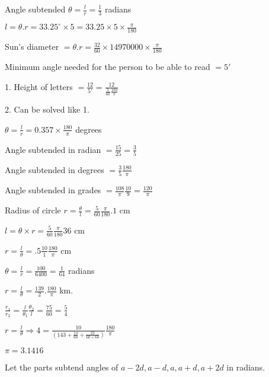 \item Angle subtended $\theta = \frac{l}{r} = \frac{1}{3}$ radians

\item $l = \theta . r = 33.25^\circ \times 5 = 33.25\times 5 \times \frac{\pi}{180}$

\item Sun's diameter $= \theta .r = \frac{32}{60}\times 14970000\times \frac{\pi}{180}$

\item Minimum angle needed for the person to be able to read $= 5'$

    1. Height of letters $= \frac{12}{5'} = \frac{12}{\frac{5}{60}\frac{180}{\pi}}$

    2. Can be solved like 1.

\item $\theta = \frac{l}{r} = 0.357\times \frac{180}{\pi}$ degrees

\item Angle subtended in radian $= \frac{15}{25} = \frac{3}{5}$

    Angle subtended in degrees $= \frac{3}{5}\frac{180}{\pi}$

    Angle subtended in grades $= \frac{108}{\pi}\frac{10}{9} = \frac{120}{\pi}$

\item Radius of circle $r = \frac{\theta}{l} = \frac{5}{60}\frac{\pi}{180}.1$ cm

\item $l = \theta \times r = \frac{5}{60}\frac{\pi}{180}36$ cm

\item $r = \frac{l}{\theta} = .5 \frac{10}{1}\frac{180}{\pi}$ cm

\item $\theta = \frac{l}{r} = \frac{100}{6400} = \frac{1}{64}$ radians

\item $r = \frac{l}{\theta} = \frac{139}{2}.\frac{180}{\pi}$ km.

\item $\frac{r_1}{r_2} = \frac{l}{\theta_1}\frac{\theta_2}{l} = \frac{75}{60} = \frac{5}{4}$

\item $r = \frac{l}{\theta} \Rightarrow 4 = \frac{10}{\left(143 + \frac{14}{60} + \frac{22}{60\times
    60}\right)}\frac{180}{\pi}$

    $\pi = 3.1416$

\item Let the parts subtend angles of $a - 2d, a - d, a, a + d, a + 2d$ in radians.

